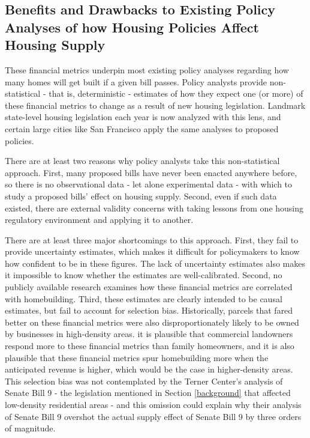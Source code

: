 \documentclass[a4paper,12pt]{article}
\begin{document}
\subsection{Benefits and Drawbacks to Existing Policy Analyses of how Housing Policies Affect Housing Supply}

\label{exist.policy.analysis} 
These financial metrics underpin most existing policy analyses regarding how many homes will get built if a given bill passes.\cite{la}\cite{ab2011} Policy analysts provide non-statistical - that is, deterministic - estimates of how they expect one (or more) of these financial metrics to change as a result of new housing legislation. Landmark state-level housing legislation each year is now analyzed with this lens, and certain large cities like San Francisco apply the same analyses to proposed policies.\cite{SFHousingElement2022}

There are at least two reasons why policy analysts take this non-statistical approach. First, many proposed bills have never been enacted anywhere before, so there is no observational data - let alone experimental data - with which to study a proposed bills' effect on housing supply. Second, even if such data existed, there are external validity concerns with taking lessons from one housing regulatory environment and applying it to another. 

There are at least three major shortcomings to this approach. First, they fail to provide uncertainty estimates, which makes it difficult for policymakers to know how confident to be in these figures. The lack of uncertainty estimates also makes it impossible to know whether the estimates are well-calibrated. Second, no publicly available research examines how these financial metrics are correlated with homebuilding. Third, these estimates are clearly intended to be causal estimates, but fail to account for selection bias. Historically, parcels that fared better on these financial metrics were also disproportionately likely to be owned by businesses in high-density areas. it is plausible that commercial landowners respond more to these financial metrics than family homeowners, and it is also plausible that these financial metrics spur homebuilding more when the anticipated revenue is higher, which would be the case in higher-density areas. This selection bias was not contemplated by the Terner Center's analysis of Senate Bill 9 - the legislation mentioned in Section \ref{background} that affected low-density residential areas - and this omission could explain why their analysis of Senate Bill 9 overshot the actual supply effect of Senate Bill 9 by three orders of magnitude. 
\end{document}
